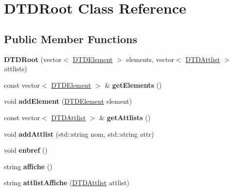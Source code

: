 \hypertarget{class_d_t_d_root}{\section{\-D\-T\-D\-Root \-Class \-Reference}
\label{class_d_t_d_root}
}
\subsection*{\-Public \-Member \-Functions}
\begin{DoxyCompactItemize}
\item 
\hypertarget{class_d_t_d_root_ab52453e8103df30febeba18c179ba1cc}{{\bfseries \-D\-T\-D\-Root} (vector$<$ \hyperlink{class_d_t_d_element}{\-D\-T\-D\-Element} $>$ elements, vector$<$ \hyperlink{struct_d_t_d_attlist}{\-D\-T\-D\-Attlist} $>$ attlists)}\label{class_d_t_d_root_ab52453e8103df30febeba18c179ba1cc}

\item 
\hypertarget{class_d_t_d_root_ac643ec28255077ceb6942faf4fc97bcd}{const vector$<$ \hyperlink{class_d_t_d_element}{\-D\-T\-D\-Element} $>$ \& {\bfseries get\-Elements} ()}\label{class_d_t_d_root_ac643ec28255077ceb6942faf4fc97bcd}

\item 
\hypertarget{class_d_t_d_root_a49adac91f72b7f61d8679995d1549672}{void {\bfseries add\-Element} (\hyperlink{class_d_t_d_element}{\-D\-T\-D\-Element} element)}\label{class_d_t_d_root_a49adac91f72b7f61d8679995d1549672}

\item 
\hypertarget{class_d_t_d_root_a0ed52a2a9d7efa7be996a0f8ba9e4609}{const vector$<$ \hyperlink{struct_d_t_d_attlist}{\-D\-T\-D\-Attlist} $>$ \& {\bfseries get\-Attlists} ()}\label{class_d_t_d_root_a0ed52a2a9d7efa7be996a0f8ba9e4609}

\item 
\hypertarget{class_d_t_d_root_a007ab64455fee742e1841157b1a32201}{void {\bfseries add\-Attlist} (std\-::string nom, std\-::string attr)}\label{class_d_t_d_root_a007ab64455fee742e1841157b1a32201}

\item 
\hypertarget{class_d_t_d_root_a39a2797e1bb64346d296720b17eb5851}{void {\bfseries enbref} ()}\label{class_d_t_d_root_a39a2797e1bb64346d296720b17eb5851}

\item 
\hypertarget{class_d_t_d_root_a81bbba20a0780b7d88d534c5e3088caf}{string {\bfseries affiche} ()}\label{class_d_t_d_root_a81bbba20a0780b7d88d534c5e3088caf}

\item 
\hypertarget{class_d_t_d_root_a567e83970b3aa10f9c65c27344ccae2c}{string {\bfseries attlist\-Affiche} (\hyperlink{struct_d_t_d_attlist}{\-D\-T\-D\-Attlist} attlist)}\label{class_d_t_d_root_a567e83970b3aa10f9c65c27344ccae2c}

\end{DoxyCompactItemize}
